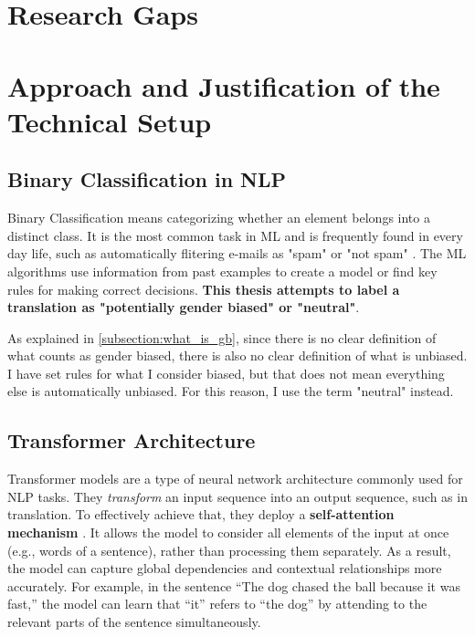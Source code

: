 
\section{Research Gaps}


\section{Approach and Justification of the Technical Setup}



\subsection{Binary Classification in NLP}
Binary Classification means categorizing whether an element belongs into a distinct class. It is the most common task in ML and is frequently found in every day life, such as automatically flitering e-mails as "spam" or "not spam" \citep{quemyBinaryClassificationUnstructured2019}. The ML algorithms use information from past examples to create a model or find key rules for making correct decisions. \textbf{This thesis attempts to label a translation as "potentially gender biased" or "neutral"}. 

As explained in \autoref{subsection:what_is_gb}, since there is no clear definition of what counts as gender biased, there is also no clear definition of what is unbiased. I have set rules for what I consider biased, but that does not mean everything else is automatically unbiased. For this reason, I use the term "neutral" instead.

\subsection{Transformer Architecture}
Transformer models are a type of neural network architecture commonly used for NLP tasks. They \textit{transform} an input sequence into an output sequence, such as in translation. To effectively achieve that, they deploy a \textbf{self-attention mechanism} \citep{phuongFormalAlgorithmsTransformers2022}. It allows the model to consider all elements of the input at once (e.g., words of a sentence), rather than processing them separately. As a result, the model can capture global dependencies and contextual relationships more accurately. For example, in the sentence “The dog chased the ball because it was fast,” the model can learn that “it” refers to “the dog” by attending to the relevant parts of the sentence simultaneously.

